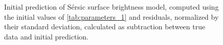 \begin{figure}[]
  \begin{minipage}{0.49\linewidth}
    \centering
  \end{minipage}
  \begin{minipage}{0.49\linewidth}
    \centering
  \end{minipage}
  \caption[Initial prediction Sérsic profile + residuals]{\protect{} Initial prediction of Sérsic surface brightness model, computed using the initial values of \cref{tab:parameters_1} and \protect{} residuals, normalized by their standard deviation, calculated as subtraction between true data and initial prediction.}
  \label{fig:1_initial}
\end{figure}

